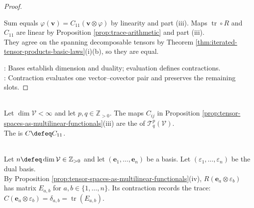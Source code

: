 \begin{proposition}
\begin{proof}
\begin{enumerate}[label=(\roman*)]
Sum equals $\varphi(\mathbf{v})=C_{11}(\mathbf{v}\otimes\varphi)$ by linearity and part (iii). Maps $\operatorname{tr}\circ R$ and $C_{11}$ are linear by Proposition \ref{prop:trace-arithmetic} and part (iii).\\
They agree on the spanning decomposable tensors by Theorem \ref{thm:iterated-tensor-products-basic-laws}(i)(b), so they are equal.
\end{enumerate}
: Bases establish dimension and duality; evaluation defines contractions.\\
: Contraction evaluates one vector--covector pair and preserves the remaining slots.
\end{proof}
\end{proposition}

\begin{definition} \label{def:contraction-map} \\
Let $\dim\mathcal{V}<\infty$ and let $p,q\in\mathbb{Z}_{>0}$. The maps $C_{ij}$ in Proposition \ref{prop:tensor-spaces-as-multilinear-functionals}(iii) are the  of $\mathcal{T}^{p}_{q}(\mathcal{V})$.\\
The  is $C\defeq C_{11}$.
\end{definition}

\begin{example} \label{ex:rank-one-operator-contraction-trace} \\
Let $n\defeq\dim\mathcal{V}\in\mathbb{Z}_{>0}$ and let $(\mathbf{e}_1,\ldots,\mathbf{e}_n)$ be a basis. Let $(\varepsilon_1,\ldots,\varepsilon_n)$ be the dual basis.\\
By Proposition \ref{prop:tensor-spaces-as-multilinear-functionals}(iv), $R(\mathbf{e}_a\otimes\varepsilon_b)$ has matrix $E_{a,b}$ for $a,b\in\{1,\ldots,n\}$. Its contraction records the trace: $C(\mathbf{e}_a\otimes\varepsilon_b)=\delta_{a,b}=\operatorname{tr}(E_{a,b})$.
\end{example}
